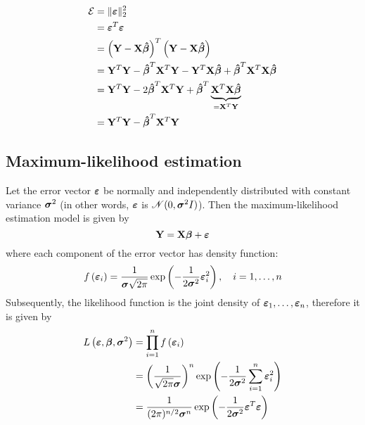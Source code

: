 \begin{align*}
    \prederr
     & = \| \eps \|_2^2                                                                     \\
     & = \eps^T \eps                                                                        \\
     & = \left( \Y - \X \btahat \right)^T \left(\Y - \X \btahat  \right)                    \\
     & = \Y^T \Y - \btahat^T \X^T \Y - \Y^T \X \btahat + \btahat^T \X^T \X \btahat          \\
     & = \Y^T \Y - 2 \btahat^T \X^T \Y + \btahat^T \underbrace{\X^T \X \btahat}_{= \X^T \Y} \\
     & = \Y^T \Y - \btahat^T \X^T \Y                                                        \\
\end{align*}



\subsection{Maximum-likelihood estimation}
Let the error vector \(\eps\) be normally and independently distributed with constant variance \(\sgm^2\) (in other words, \(\eps\) is \(\mathscr{N}(0, \sgm^2 I)\)). Then the maximum-likelihood estimation model is given by
\[
    \Y = \X \bta + \eps
\]
where each component of the error vector has density function:
\[
    f \left(\eps_{i}\right) = \frac{1}{\sgm \sqrt{2 \pi}} \exp \left(-\frac{1}{2 \sgm^{2}} \eps_{i}^{2}\right), \quad i = 1, \ldots, n
\]
Subsequently, the likelihood function is the joint density of \(\eps_1, \ldots, \eps_n\), therefore it is given by
\begin{align*}
    L\left({\eps}, \bta, \sgm^{2}\right)
     & = \prod_{i=1}^{n} f\left(\eps_{i}\right)                                                                        \\
     & = \left( \frac{1}{\sqrt{2 \pi} \sgm} \right)^n \exp \left(-\frac{1}{2 \sgm^{2}} \sum_{i=1}^{n} \eps_i^2 \right) \\
     & = \frac{1}{(2 \pi)^{n / 2} \sgm^{n}} \exp \left(-\frac{1}{2 \sgm^{2}} \eps^T \eps\right)                        \\
\end{align*}

